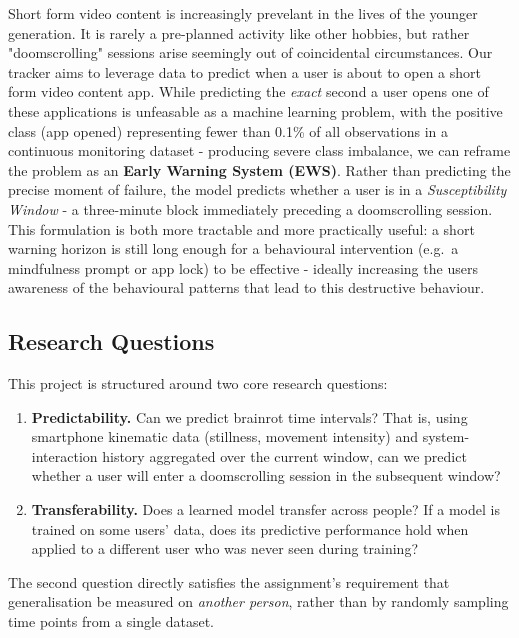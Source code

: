 \documentclass[runningheads]{llncs}
\begin{document}
Short form video content is increasingly prevelant in the lives of the younger generation. It is rarely a pre-planned activity like other hobbies, but rather "doomscrolling" sessions arise seemingly out of coincidental circumstances. Our tracker aims to leverage data to predict when a user is about to open a short form video content app. While predicting the \emph{exact} second a user opens one of these applications is unfeasable as a machine learning problem, with the positive class (app opened)
representing fewer than 0.1\% of all observations in a continuous monitoring dataset -
producing severe class imbalance, we can reframe the problem as an \textbf{Early Warning System (EWS)}. Rather than predicting
the precise moment of failure, the model predicts whether a user is in a
\emph{Susceptibility Window} - a three-minute block immediately preceding a doomscrolling
session. This formulation is both more tractable
and more practically useful: a short warning horizon is still long enough for a behavioural
intervention (e.g.\ a mindfulness prompt or app lock) to be effective - ideally increasing the users awareness of the behavioural patterns that lead to this destructive behaviour.

\subsection{Research Questions}

This project is structured around two core research questions:

\begin{enumerate}
    \item \textbf{Predictability.} Can we predict brainrot time intervals? That is, using
          smartphone kinematic data (stillness, movement intensity) and system-interaction
          history aggregated over the current window, can we predict whether a user will
          enter a doomscrolling session in the subsequent window?
    \item \textbf{Transferability.} Does a learned model transfer across people? If a model
          is trained on some users' data, does its predictive performance hold when applied
          to a different user who was never seen during training?
\end{enumerate}

The second question directly satisfies the assignment's requirement that generalisation be
measured on \emph{another person}, rather than by randomly sampling time points from a
single dataset.
\end{document}

